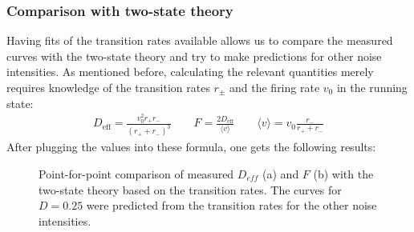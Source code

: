 \documentclass[12pt,a4paper]{article}
\begin{document}
\subsubsection{Comparison with two-state theory}
Having fits of the transition rates available allows us to compare the measured curves with the two-state theory and try to make predictions for other noise intensities. As mentioned before, calculating the relevant quantities merely requires knowledge of the transition rates $r_\pm$ and the firing rate $v_0$ in the running state:
\begin{align*}
D_{\text{eff}}=\frac{v_0^2 r_+r_-}{(r_++r_-)^3}\qquad F=\frac{2D_{\text{eff}}}{\langle v\rangle}\qquad\langle v\rangle=v_0\frac{r_-}{r_++r_-}
\end{align*}
After plugging the values into these formula, one gets the following results:
\begin{figure}[H]
	\hspace*{-0.5cm}
	\caption{Point-for-point comparison of measured $D_{eff}$ (a) and $F$ (b) with the two-state theory based on the transition rates. The curves for $D=0.25$ were predicted from the transition rates for the other noise intensities.}
\end{figure}
\end{document}
